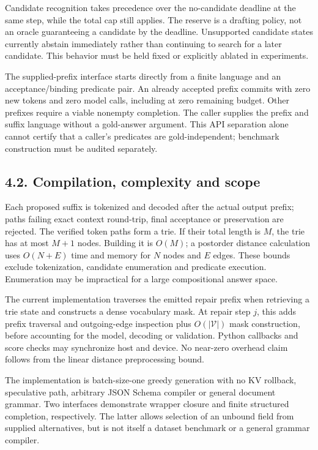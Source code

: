 \documentclass[
  12pt,
  a4paper,
]{article}
\begin{document}
Candidate recognition takes precedence over the no-candidate deadline at
the same step, while the total cap still applies. The reserve is a
drafting policy, not an oracle guaranteeing a candidate by the deadline.
Unsupported candidate states currently abstain immediately rather than
continuing to search for a later candidate. This behavior must be held
fixed or explicitly ablated in experiments.

The supplied-prefix interface starts directly from a finite language and
an acceptance/binding predicate pair. An already accepted prefix commits
with zero new tokens and zero model calls, including at zero remaining
budget. Other prefixes require a viable nonempty completion. The caller
supplies the prefix and suffix language without a gold-answer argument.
This API separation alone cannot certify that a caller's predicates are
gold-independent; benchmark construction must be audited separately.

\subsection{4.2. Compilation, complexity and
scope}\label{compilation-complexity-and-scope}

Each proposed suffix is tokenized and decoded after the actual output
prefix; paths failing exact context round-trip, final acceptance or
preservation are rejected. The verified token paths form a trie. If
their total length is \(M\), the trie has at most \(M+1\) nodes.
Building it is \(O(M)\); a postorder distance calculation uses
\(O(N+E)\) time and memory for \(N\) nodes and \(E\) edges. These bounds
exclude tokenization, candidate enumeration and predicate execution.
Enumeration may be impractical for a large compositional answer space.

The current implementation traverses the emitted repair prefix when
retrieving a trie state and constructs a dense vocabulary mask. At
repair step \(j\), this adds prefix traversal and outgoing-edge
inspection plus \(O(|\mathcal V|)\) mask construction, before accounting
for the model, decoding or validation. Python callbacks and score checks
may synchronize host and device. No near-zero overhead claim follows
from the linear distance preprocessing bound.

The implementation is batch-size-one greedy generation with no KV
rollback, speculative path, arbitrary JSON Schema compiler or general
document grammar. Two interfaces demonstrate wrapper closure and finite
structured completion, respectively. The latter allows selection of an
unbound field from supplied alternatives, but is not itself a dataset
benchmark or a general grammar compiler.
\end{document}

